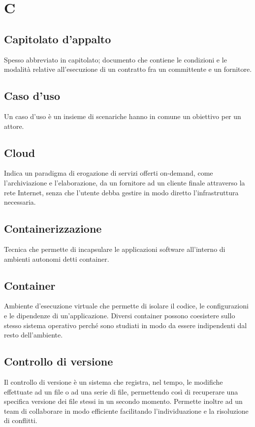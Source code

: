 \clearpage
\section*{C}

\subsection*{Capitolato d'appalto}
Spesso abbreviato in capitolato; documento che contiene le condizioni e le modalità relative all'esecuzione di un contratto fra un committente e un fornitore.

\subsection*{Caso d'uso}
Un caso d’uso è un insieme di scenari\glosp che hanno in comune un obiettivo per un attore\glo.

\subsection*{Cloud}
Indica un paradigma di erogazione di servizi offerti on-demand, come l'archiviazione e l'elaborazione, da un fornitore ad un cliente finale attraverso la rete Internet, senza che l'utente debba gestire in modo diretto l'infrastruttura necessaria.

\subsection*{Containerizzazione}
Tecnica che permette di incapsulare le applicazioni software all’interno di ambienti autonomi detti container\glo.

\subsection*{Container}
Ambiente d'esecuzione virtuale che permette di isolare il codice, le configurazioni e le dipendenze di un'applicazione. Diversi container possono coesistere sullo stesso sistema operativo perché sono studiati in modo da essere indipendenti dal resto dell'ambiente.

\subsection*{Controllo di versione}
Il controllo di versione è un sistema che registra, nel tempo, le modifiche effettuate ad un file o ad una serie di file, permettendo così di recuperare una specifica versione dei file stessi in un secondo momento.
Permette inoltre ad un team di collaborare in modo efficiente facilitando l'individuazione e la risoluzione di conflitti.

